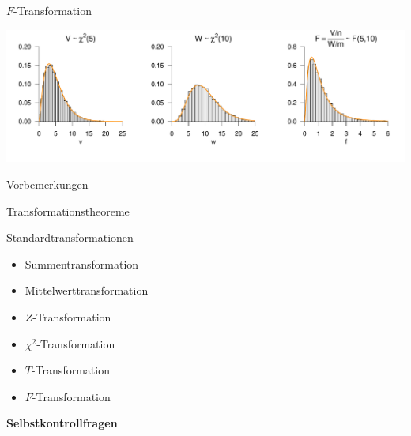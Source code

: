 \documentclass[
  8pt,
  ignorenonframetext,
]{beamer}
\providecommand{\tightlist}{%
  \setlength{\itemsep}{0pt}\setlength{\parskip}{0pt}}
\begin{document}
\begin{frame}{\(F\)-Transformation}
\protect\hypertarget{f-transformation-3}{}
\vspace{5mm}
\vfill

\begin{center}\includegraphics[width=1\linewidth]{8_Abbildungen/wtfi_8_f_transform} \end{center}
\vfill
\end{frame}

\begin{frame}{}
\protect\hypertarget{section-12}{}
\large

Vorbemerkungen

Transformationstheoreme

Standardtransformationen

\normalsize

\begin{itemize}
\tightlist
\item
  Summentransformation
\item
  Mittelwerttransformation
\item
  \(Z\)-Transformation
\item
  \(\chi^2\)-Transformation
\item
  \(T\)-Transformation
\item
  \(F\)-Transformation
\end{itemize}

\textbf{Selbstkontrollfragen}
\end{frame}
\end{document}
